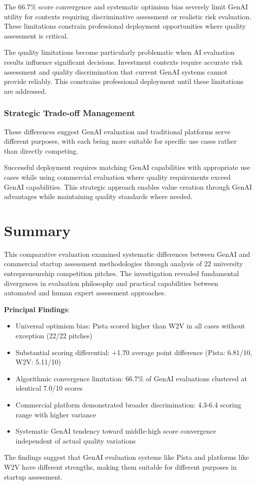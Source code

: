 The 66.7\% score convergence and systematic optimism bias severely limit GenAI utility for contexts requiring discriminative assessment or realistic risk evaluation. These limitations constrain professional deployment opportunities where quality assessment is critical.

The quality limitations become particularly problematic when AI evaluation results influence significant decisions. Investment contexts require accurate risk assessment and quality discrimination that current GenAI systems cannot provide reliably. This constrains professional deployment until these limitations are addressed.

\subsubsection{Strategic Trade-off Management}
\label{subsec:strategy}

These differences suggest GenAI evaluation and traditional platforms serve different purposes, with each being more suitable for specific use cases rather than directly competing.

Successful deployment requires matching GenAI capabilities with appropriate use cases while using commercial evaluation where quality requirements exceed GenAI capabilities. This strategic approach enables value creation through GenAI advantages while maintaining quality standards where needed.

\section{Summary}
\label{sec:summary}

This comparative evaluation examined systematic differences between GenAI and commercial startup assessment methodologies through analysis of 22 university entrepreneurship competition pitches. The investigation revealed fundamental divergences in evaluation philosophy and practical capabilities between automated and human expert assessment approaches.

\textbf{Principal Findings}:
\begin{itemize}
    \item Universal optimism bias: Pista scored higher than W2V in all cases without exception (22/22 pitches)
    \item Substantial scoring differential: +1.70 average point difference (Pista: 6.81/10, W2V: 5.11/10)
    \item Algorithmic convergence limitation: 66.7\% of GenAI evaluations clustered at identical 7.0/10 scores
    \item Commercial platform demonstrated broader discrimination: 4.3-6.4 scoring range with higher variance
    \item Systematic GenAI tendency toward middle-high score convergence independent of actual quality variations
\end{itemize}

The findings suggest that GenAI evaluation systems like Pista and platforms like W2V have different strengths, making them suitable for different purposes in startup assessment.